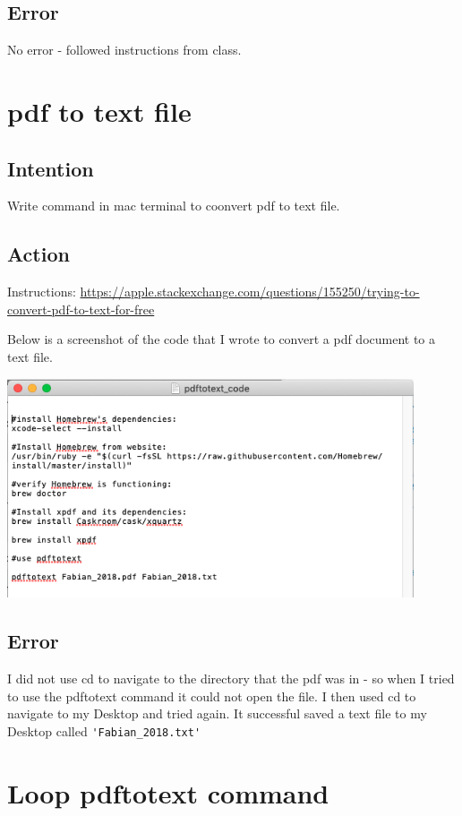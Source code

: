\documentclass{article}
\begin{document}
\subsection{Error}
No error - followed instructions from class. 

\section{pdf to text file}
\subsection{Intention}
Write command in mac terminal to coonvert pdf to text file.

\subsection{Action}
Instructions: \href{https://apple.stackexchange.com/questions/155250/trying-to-convert-pdf-to-text-for-free}{https://apple.stackexchange.com/questions/155250/trying-to-convert-pdf-to-text-for-free}

Below is a screenshot of the code that I wrote to convert a pdf document to a text file. 

\includegraphics[width=12cm]{pdftotext.png}

\subsection{Error}
I did not use cd to navigate to the directory that the pdf was in - so when I tried to use the pdftotext command it could not open the file. I then used cd to navigate to my Desktop and tried again. It successful saved a text file to my Desktop called \verb|'Fabian_2018.txt'|

\section{Loop pdftotext command}
\end{document}
